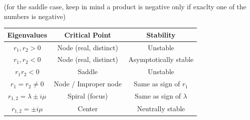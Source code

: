 \documentclass{report}
\begin{document}





(for the saddle case, keep in mind a product is negative only 
if exaclty one of the numbers is negative) 

\renewcommand{\arraystretch}{1.1} %
\begin{tabular}{|c|c|c|}
\hline
\textbf{Eigenvalues} & \textbf{Critical Point} & \textbf{Stability} \\
\hline
$r_1, r_2 > 0$ & Node (real, distinct) & Unstable \\
$r_1, r_2 < 0$ & Node (real, distinct) & Asymptotically stable \\
$r_1 r_2 < 0$ & Saddle & Unstable \\
$r_1 = r_2 \neq 0$ & Node / Improper node & Same as sign of $r_1$ \\
$r_{1,2} = \lambda \pm i\mu$ & Spiral (focus) & Same as sign of $\lambda$ \\
$r_{1,2} = \pm i\mu$ & Center & Neutrally stable \\
\hline
\end{tabular}
\end{document}
